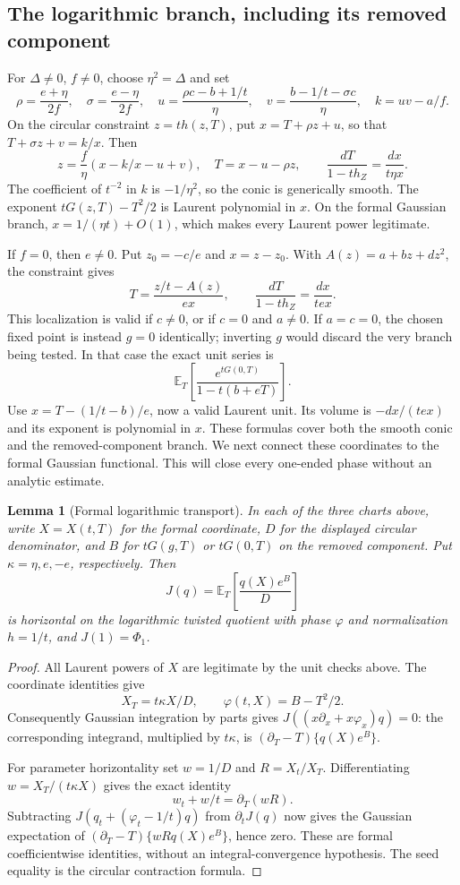 \documentclass[11pt]{article}
\newtheorem{lemma}[theorem]{Lemma}
\theoremstyle{definition}\newtheorem{definition}[theorem]{Definition}
\theoremstyle{remark}\newtheorem{remark}[theorem]{Remark}
\newcommand{\E}{\mathbb E}
\begin{document}
\subsection{The logarithmic branch, including its removed component}

For $\Delta\ne0$, $f\ne0$, choose $\eta^2=\Delta$ and set
\[
 \rho=\frac{e+\eta}{2f},\quad \sigma=\frac{e-\eta}{2f},\quad
 u=\frac{\rho c-b+1/t}{\eta},\quad
 v=\frac{b-1/t-\sigma c}{\eta},\quad k=uv-a/f.
\]
On the circular constraint $z=th(z,T)$, put
$x=T+\rho z+u$, so that $T+\sigma z+v=k/x$. Then
\[
 z=\frac f\eta(x-k/x-u+v),\quad T=x-u-\rho z,
 \qquad
 \frac{dT}{1-th_Z}=\frac{dx}{t\eta x}.
\]
The coefficient of $t^{-2}$ in $k$ is $-1/\eta^2$, so the conic
is generically smooth. The exponent $tG(z,T)-T^2/2$ is Laurent
polynomial in $x$. On the formal Gaussian branch,
$x=1/(\eta t)+O(1)$, which makes every Laurent power legitimate.

If $f=0$, then $e\ne0$. Put $z_0=-c/e$ and $x=z-z_0$. With
$A(z)=a+bz+dz^2$, the constraint gives
\[
 T=\frac{z/t-A(z)}{ex},\qquad
 \frac{dT}{1-th_Z}=\frac{dx}{tex}.
\]
This localization is valid if $c\ne0$, or if $c=0$ and $a\ne0$.
If $a=c=0$, the chosen fixed point is instead $g=0$ identically;
inverting $g$ would discard the very branch being tested. In that
case the exact unit series is
\[
 \E_T\left[\frac{e^{tG(0,T)}}{1-t(b+eT)}\right].
\]
Use $x=T-(1/t-b)/e$, now a valid Laurent unit. Its volume is
$-dx/(tex)$ and its exponent is polynomial in $x$. These formulas
cover both the smooth conic and the removed-component branch.
We next connect these coordinates to the formal Gaussian functional.
This will close every one-ended phase without an analytic estimate.

\begin{lemma}[Formal logarithmic transport]\label{lem:logtransport}
In each of the three charts above, write $X=X(t,T)$ for the formal
coordinate, $D$ for the displayed circular denominator, and $B$ for
$tG(g,T)$ or $tG(0,T)$ on the removed component. Put
$\kappa=\eta,e,-e$, respectively. Then
\[
 J(q)=\E_T\!\left[\frac{q(X)e^B}{D}\right]
\]
is horizontal on the logarithmic twisted quotient with phase
$\varphi$ and normalization $h=1/t$, and $J(1)=\Phi_1$.
\end{lemma}
\begin{proof}
All Laurent powers of $X$ are legitimate by the unit checks above.
The coordinate identities give
\[
 X_T=t\kappa X/D,\qquad
 \varphi(t,X)=B-T^2/2.
\]
Consequently Gaussian integration by parts gives
$J((x\partial_x+x\varphi_x)q)=0$: the corresponding integrand,
multiplied by $t\kappa$, is
$(\partial_T-T)\{q(X)e^B\}$.

For parameter horizontality set $w=1/D$ and $R=X_t/X_T$.
Differentiating $w=X_T/(t\kappa X)$ gives the exact identity
\[
 w_t+w/t=\partial_T(wR).
\]
Subtracting $J(q_t+(\varphi_t-1/t)q)$ from $\partial_tJ(q)$ now
gives the Gaussian expectation of
$(\partial_T-T)\{wR q(X)e^B\}$, hence zero. These are formal
coefficientwise identities, without an integral-convergence hypothesis.
The seed equality is the circular contraction formula.
\end{proof}
\end{document}
